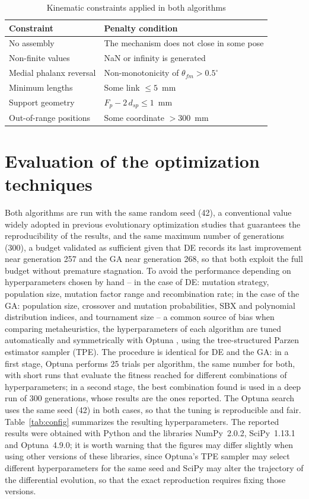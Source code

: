 \documentclass[conference]{IEEEtran}
\begin{document}
\begin{table}[htbp]
\caption{Kinematic constraints applied in both algorithms}
\begin{center}
\begin{tabular}{|l|l|}
\hline
\textbf{Constraint} & \textbf{Penalty condition} \\
\hline
No assembly & The mechanism does not close in some pose \\
\hline
Non-finite values & NaN or infinity is generated \\
\hline
Medial phalanx reversal & Non-monotonicity of $\theta_{fm} > 0.5^{\circ}$ \\
\hline
Minimum lengths & Some link $\leq 5$~mm \\
\hline
Support geometry & $F_p - 2\,d_{sp} \leq 1$~mm \\
\hline
Out-of-range positions & Some coordinate $> 300$~mm \\
\hline
\end{tabular}
\label{tab:restricciones}
\end{center}
\end{table}

\section{Evaluation of the optimization techniques}
Both algorithms are run with the same random seed (42), a conventional value
widely adopted in previous evolutionary optimization studies that guarantees the
reproducibility of the results, and the same maximum number of generations (300),
a budget validated as sufficient given that DE records its last improvement near
generation 257 and the GA near generation 268, so that both exploit the full
budget without premature stagnation. To avoid the performance depending on
hyperparameters chosen by hand -- in the case of DE: mutation strategy, population
size, mutation factor range and recombination rate; in the case of the GA:
population size, crossover and mutation probabilities, SBX and polynomial
distribution indices, and tournament size -- a common source of bias when
comparing metaheuristics, the hyperparameters of each algorithm are tuned
automatically and symmetrically with Optuna \cite{ref_optuna}, using the
tree-structured Parzen estimator sampler (TPE). The procedure is identical for DE
and the GA: in a first stage, Optuna performs 25 trials per algorithm, the same
number for both, with short runs that evaluate the fitness reached for different
combinations of hyperparameters; in a second stage, the best combination found is
used in a deep run of 300 generations, whose results are the ones reported. The
Optuna search uses the same seed (42) in both cases, so that the tuning is
reproducible and fair. Table~\ref{tab:config} summarizes the resulting
hyperparameters. The reported results were obtained with Python and the libraries
NumPy~2.0.2, SciPy~1.13.1 and Optuna~4.9.0; it is worth warning that the figures
may differ slightly when using other versions of these libraries, since Optuna's
TPE sampler may select different hyperparameters for the same seed and SciPy may
alter the trajectory of the differential evolution, so that the exact
reproduction requires fixing those versions.
\end{document}
